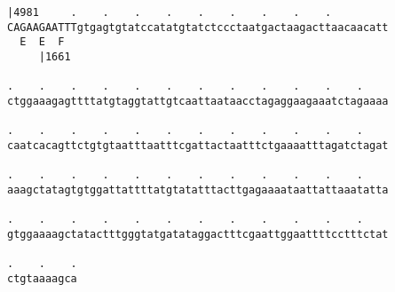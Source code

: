 \documentclass{article}
\begin{document}
\newpage
\begin{Verbatim}[fontfamily=courier]
     |4981     .    .    .    .    .    .    .    .    .    
CAGAAGAATTTgtgagtgtatccatatgtatctccctaatgactaagacttaacaacatt
  E  E  F                                                   
     |1661                                                  

.    .    .    .    .    .    .    .    .    .    .    .    
ctggaaagagttttatgtaggtattgtcaattaataacctagaggaagaaatctagaaaa

.    .    .    .    .    .    .    .    .    .    .    .    
caatcacagttctgtgtaatttaatttcgattactaatttctgaaaatttagatctagat

.    .    .    .    .    .    .    .    .    .    .    .    
aaagctatagtgtggattattttatgtatatttacttgagaaaataattattaaatatta

.    .    .    .    .    .    .    .    .    .    .    .    
gtggaaaagctatactttgggtatgatataggactttcgaattggaattttcctttctat

.    .    .
ctgtaaaagca
\end{Verbatim}
\newpage
\end{document}
